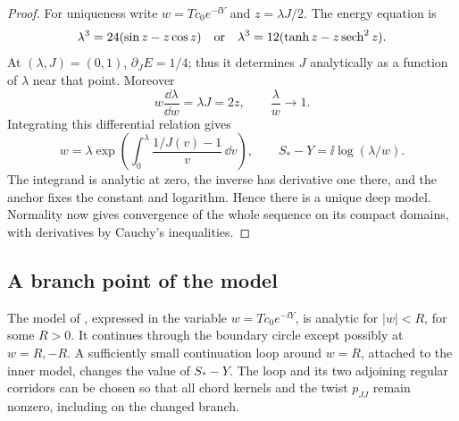 \begin{proof}
For uniqueness write \(w=Tc_0e^{-\ii Y}\) and
\(z=\lambda J/2\). The energy equation is
\begin{equation}
 \label{profile:lambda-equations}
 \lambda^3=24(\sin z-z\cos z)
 \quad\hbox{or}\quad
 \lambda^3=12(\tanh z-z\operatorname{sech}^2z).
\end{equation}
At \((\lambda,J)=(0,1)\), \(\partial_J E=1/4\); thus it determines
\(J\) analytically as a function of \(\lambda\) near that point.
Moreover
\[
 w\frac{\dd\lambda}{\dd w}=\lambda J=2z,
 \qquad \frac{\lambda}{w}\longrightarrow1.
\]
Integrating this differential relation gives
\begin{equation}
 \label{profile:inverse-lambda}
 w=\lambda\exp\left(\int_0^\lambda
                  \frac{1/J(v)-1}{v}\,\dd v\right),
 \qquad S_*-Y=\ii\log(\lambda/w).
\end{equation}
The integrand is analytic at zero, the inverse has derivative one
there, and the anchor fixes the constant and logarithm. Hence there
is a unique deep model. Normality now gives convergence of the whole
sequence on its compact domains, with derivatives by Cauchy's
inequalities.
\end{proof}

\subsection{A branch point of the model}

\begin{lemma}
\label{profile:branch-model}
The model of , expressed in the variable
\(w=Tc_0e^{-\ii Y}\), is analytic for \(|w|<R\), for some
\(R>0\). It continues through the boundary circle except possibly
at \(w=R,-R\). A sufficiently small continuation loop around
\(w=R\), attached to the inner model, changes the value of
\(S_*-Y\). The loop and its two adjoining regular corridors can be
chosen so that all chord kernels and the twist \(p_{JJ}\) remain
nonzero, including on the changed branch.
\end{lemma}

